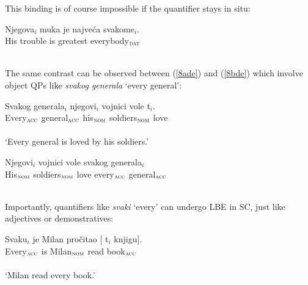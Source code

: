 \documentclass[
    output=paper,
    colorlinks,
    citecolor=brown,
]{langscibook}
\begin{document}
This binding is of course impossible if the quantifier stays in situ:

\begin{exe}
\ex \label{7de}
\gll *Njegova$_{i}$ muka   je  najveća  svakome$_{i}$.\\
His trouble is greatest everybody$_{\textsc{dat}}$\\\\
\end{exe}

The same contrast can be observed between (\ref{8ade}) and (\ref{8bde}) which involve object QPs like \textit{svakog generala} ‘every general’:

\begin{exe}
\ex \label{8de}
\begin{xlist}
\ex \label{8ade}
\gll Svakog generala$_{i}$ njegovi$_{i}$ vojnici vole t$_{i}$.\\
Every$_{\textsc{acc}}$ general$_{\textsc{acc}}$ his$_{\textsc{nom}}$ soldiers$_{\textsc{nom}}$ love\\\\
‘Every general is loved by his soldiers.’

\ex \label{8bde}
\gll *Njegovi$_{i}$ vojnici vole svakog generala$_{i}$\\
His$_{\textsc{nom}}$ soldiers$_{\textsc{nom}}$ love every$_{\textsc{acc}}$ general$_{\textsc{acc}}$\\\\

\end{xlist}
\end{exe}

Importantly, quantifiers like \textit{svaki} ‘every’ can undergo LBE in SC, just like adjectives or demonstratives:

\begin{exe}
\ex \label{9de}
\gll Svaku$_{i}$ je Milan pročitao [ t$_{i}$  knjigu].\\
Every$_{\textsc{acc}}$ is Milan$_{\textsc{nom}}$ read book$_{\textsc{acc}}$\\\\
‘Milan read every book.’ 
\end{exe}
\end{document}
